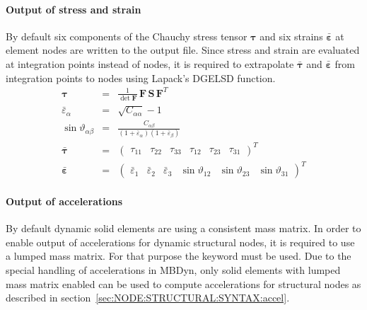 \paragraph{Output of stress and strain}
By default six components of the Chauchy stress tensor $\boldsymbol{\tau}$ and six strains $\bar{\boldsymbol{\varepsilon}}$ at element nodes are written to the output file.
Since stress and strain are evaluated at integration points instead of nodes, it is required to extrapolate $\bar{\boldsymbol{\tau}}$ and $\bar{\boldsymbol{\varepsilon}}$
from integration points to nodes using Lapack's DGELSD function.
\begin{eqnarray}
  \boldsymbol{\tau} & = & \frac{1}{\det{\boldsymbol{F}}} \, \boldsymbol{F} \, \boldsymbol{S} \, \boldsymbol{F}^T \\
  \bar{\varepsilon}_{\alpha} & = & \sqrt{C_{\alpha\alpha}} - 1 \\
  \sin{\vartheta_{\alpha\beta}} & = & \frac{C_{\alpha\beta}}{\left(1 + \bar{\varepsilon}_{\alpha}\right)\left(1 + \bar{\varepsilon}_{\beta}\right)} \\
  \bar{\boldsymbol{\tau}} & = & \begin{pmatrix}
    \tau_{11} &
    \tau_{22} &
    \tau_{33} &
    \tau_{12} &
    \tau_{23} &
    \tau_{31}
  \end{pmatrix}^T \\
  \bar{\boldsymbol{\varepsilon}} & = & \begin{pmatrix}
    \bar{\varepsilon}_1 &
    \bar{\varepsilon}_2 &
    \bar{\varepsilon}_3 &
    \sin{\vartheta}_{12} &
    \sin{\vartheta}_{23} &
    \sin{\vartheta}_{31}
  \end{pmatrix}^T
\end{eqnarray}

\paragraph{Output of accelerations}
By default dynamic solid elements are using a consistent mass matrix. In order to enable output of accelerations
for dynamic structural nodes, it is required to use a lumped mass matrix.
For that purpose the keyword  must be used.
Due to the special handling of accelerations in MBDyn, only solid elements with lumped mass matrix enabled
can be used to compute accelerations for structural nodes as described in section~\ref{sec:NODE:STRUCTURAL:SYNTAX:accel}.


